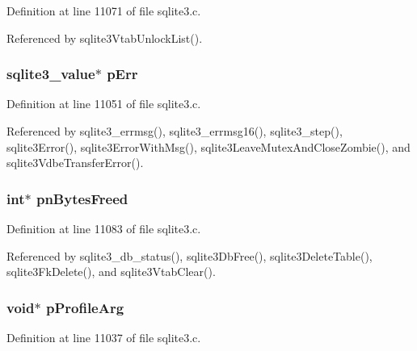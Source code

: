 Definition at line 11071 of file sqlite3.\+c.



Referenced by sqlite3\+Vtab\+Unlock\+List().

\hypertarget{structsqlite3_abb7e4e8b148f4b3d73420aa608ea64b2}{}
\subsubsection[{p\+Err}]{\setlength{\rightskip}{0pt plus 5cm}sqlite3\+\_\+value$\ast$ p\+Err}\label{structsqlite3_abb7e4e8b148f4b3d73420aa608ea64b2}


Definition at line 11051 of file sqlite3.\+c.



Referenced by sqlite3\+\_\+errmsg(), sqlite3\+\_\+errmsg16(), sqlite3\+\_\+step(), sqlite3\+Error(), sqlite3\+Error\+With\+Msg(), sqlite3\+Leave\+Mutex\+And\+Close\+Zombie(), and sqlite3\+Vdbe\+Transfer\+Error().

\hypertarget{structsqlite3_a8316e1aaf0a37fc86155f7c24584617d}{}
\subsubsection[{pn\+Bytes\+Freed}]{\setlength{\rightskip}{0pt plus 5cm}int$\ast$ pn\+Bytes\+Freed}\label{structsqlite3_a8316e1aaf0a37fc86155f7c24584617d}


Definition at line 11083 of file sqlite3.\+c.



Referenced by sqlite3\+\_\+db\+\_\+status(), sqlite3\+Db\+Free(), sqlite3\+Delete\+Table(), sqlite3\+Fk\+Delete(), and sqlite3\+Vtab\+Clear().

\hypertarget{structsqlite3_a0f504ced99e3d7be97f04803ff863723}{}
\subsubsection[{p\+Profile\+Arg}]{\setlength{\rightskip}{0pt plus 5cm}void$\ast$ p\+Profile\+Arg}\label{structsqlite3_a0f504ced99e3d7be97f04803ff863723}


Definition at line 11037 of file sqlite3.\+c.



